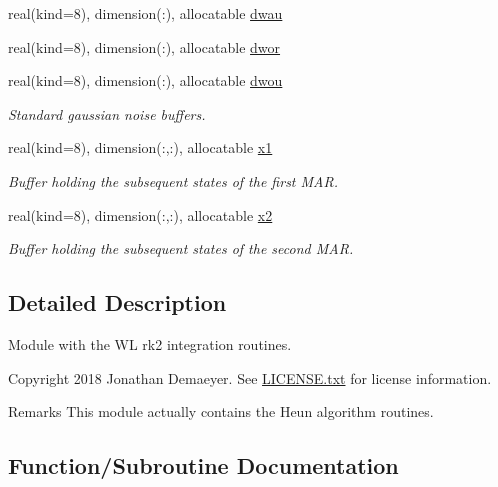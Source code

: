 \begin{DoxyCompactItemize}
\item 
real(kind=8), dimension(\+:), allocatable \hyperlink{namespacerk2__wl__integrator_afa336c0cb10e6befa1ccc44522e2f517}{dwau}
\item 
real(kind=8), dimension(\+:), allocatable \hyperlink{namespacerk2__wl__integrator_a94b90cb88115b2d39977de8b89909833}{dwor}
\item 
real(kind=8), dimension(\+:), allocatable \hyperlink{namespacerk2__wl__integrator_a1e05e6efc7acdce81954944c134ac83b}{dwou}
\begin{DoxyCompactList}\small\item\em Standard gaussian noise buffers. \end{DoxyCompactList}\item 
real(kind=8), dimension(\+:,\+:), allocatable \hyperlink{namespacerk2__wl__integrator_a5fd86898081b24e076b0830a5d1e9e51}{x1}
\begin{DoxyCompactList}\small\item\em Buffer holding the subsequent states of the first M\+AR. \end{DoxyCompactList}\item 
real(kind=8), dimension(\+:,\+:), allocatable \hyperlink{namespacerk2__wl__integrator_a7fad5dbd04a9b5dc47bdb9b8c33e44e0}{x2}
\begin{DoxyCompactList}\small\item\em Buffer holding the subsequent states of the second M\+AR. \end{DoxyCompactList}\end{DoxyCompactItemize}


\subsection{Detailed Description}
Module with the WL rk2 integration routines. 

\begin{DoxyCopyright}{Copyright}
2018 Jonathan Demaeyer. See \hyperlink{LICENSE_8txt}{L\+I\+C\+E\+N\+S\+E.\+txt} for license information. 
\end{DoxyCopyright}
\begin{DoxyRemark}{Remarks}
This module actually contains the Heun algorithm routines. 
\end{DoxyRemark}


\subsection{Function/\+Subroutine Documentation}
